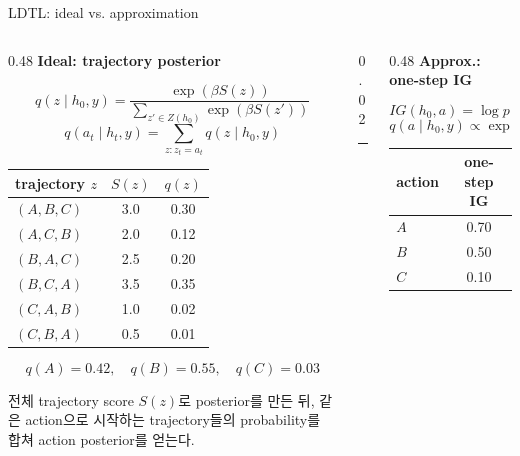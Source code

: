 \documentclass[
11pt,notheorems,hyperref={pdfauthor=whatever}
]{beamer}
\begin{document}
\begin{frame}[t]{LDTL: ideal vs. approximation}
\vspace{0.85em}
\begin{columns}[T,onlytextwidth]
\begin{column}{0.48\textwidth}
{\large\bfseries\textcolor{primary}{Ideal: trajectory posterior}}

\vspace{0.25em}
{\small
\[
q(z \mid h_0, y) =
\frac{\exp(\beta S(z))}
{\sum_{z' \in Z(h_0)} \exp(\beta S(z'))}
\]
\[
q(a_t \mid h_t, y) =
\sum_{z:z_t=a_t} q(z \mid h_0, y)
\]
}

\vspace{-0.55em}
\begin{center}
\scriptsize
\begin{tabular}{lcc}
\toprule
trajectory \(z\) & \(S(z)\) & \(q(z)\) \\
\midrule
\((A,B,C)\) & 3.0 & 0.30 \\
\((A,C,B)\) & 2.0 & 0.12 \\
\((B,A,C)\) & 2.5 & 0.20 \\
\((B,C,A)\) & 3.5 & 0.35 \\
\((C,A,B)\) & 1.0 & 0.02 \\
\((C,B,A)\) & 0.5 & 0.01 \\
\bottomrule
\end{tabular}
\end{center}

\vspace{-0.45em}
{\small
\[
q(A)=0.42,\quad q(B)=0.55,\quad q(C)=0.03
\]
}

{\scriptsize 전체 trajectory score \(S(z)\)로 posterior를 만든 뒤, 같은 action으로 시작하는 trajectory들의 probability를 합쳐 action posterior를 얻는다.}
\end{column}

\begin{column}{0.02\textwidth}
\centering
\vspace{0.05em}
\rule{0.4pt}{0.70\textheight}
\end{column}

\begin{column}{0.48\textwidth}
{\large\bfseries\textcolor{primary}{Approx.: one-step IG}}

\vspace{0.25em}
{\small
\[
IG(h_0,a)=\log p(y\mid h_0+a)-\log p(y\mid h_0)
\]
\[
q(a\mid h_0,y)\propto \exp(IG(h_0,a)/\tau)
\]
}

\vspace{-0.35em}
\begin{center}
\scriptsize
\begin{tabular}{lc}
\toprule
action & one-step IG \\
\midrule
\(A\) & 0.70 \\
\(B\) & 0.50 \\
\(C\) & 0.10 \\
\bottomrule
\end{tabular}
\end{center}


\end{column}
\end{columns}
\end{frame}
\end{document}
